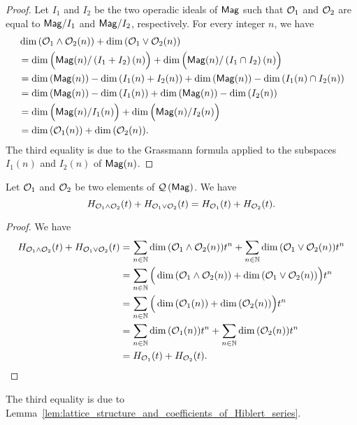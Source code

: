 \begin{proof}
  Let $I_1$ and $I_2$ be the two operadic ideals of $\mathsf{Mag}$ such that $\mathcal{O}_1$ and $\mathcal{O}_2$ are equal to $\mathsf{Mag}/I_1$ and $\mathsf{Mag}/I_2$, respectively. For every integer $n$, we have
  \[\begin{split}
  &\dim{\left(\mathcal{O}_1\wedge\mathcal{O}_2(n)\right)}+\dim{\left(\mathcal{O}_1\vee\mathcal{O}_2(n)\right)}\\
  &=\dim{\Big(\mathsf{Mag}(n)/\left(I_1+I_2\right)(n)\Big)}+\dim{\Big(\mathsf{Mag}(n)/\left(I_1\cap I_2\right)(n)\Big)}\\
  &=\dim{\left(\mathsf{Mag}(n)\right)}-\dim{\left(I_1(n)+I_2(n)\right)}+\dim{\left(\mathsf{Mag}(n)\right)}-\dim{\left(I_1(n)\cap I_2(n)\right)}\\
  &=\dim{\left(\mathsf{Mag}(n)\right)}-\dim{\left(I_1(n)\right)}+\dim{\left(\mathsf{Mag}(n)\right)}-\dim{\left(I_2(n)\right)}\\
  &=\dim{\Big(\mathsf{Mag}(n)/I_1(n)\Big)}+\dim{\Big(\mathsf{Mag}(n)/I_2(n)\Big)}\\
  &=\dim{\left(\mathcal{O}_1(n)\right)}+\dim{\left(\mathcal{O}_2(n)\right)}.
  \end{split}\]
  The third equality is due to the Grassmann formula applied to the subspaces $I_1(n)$ and $I_2(n)$ of $\mathsf{Mag}(n)$.
\end{proof}

\begin{Theorem} \label{thm:Grassmann_formula_for__Hilbert_series_of_QMag}
  Let $\mathcal{O}_1$ and $\mathcal{O}_2$ be two elements of $\mathcal{Q}\left(\mathsf{Mag}\right)$. We have
  \begin{equation} \label{equ:lattice_structure_and_Hiblert_series}
    H_{\mathcal{O}_1\wedge\mathcal{O}_2}(t)+H_{\mathcal{O}_1\vee\mathcal{O}_2}(t)=H_{\mathcal{O}_1}(t)+H_{\mathcal{O}_2}(t).
    \end{equation}
  \end{Theorem}

\begin{proof}
  We have
  \[\begin{split}
  H_{\mathcal{O}_1\wedge\mathcal{O}_2}(t)+H_{\mathcal{O}_1\vee\mathcal{O}_2}(t)&=\sum_{n\in\mathbb{N}}\dim{\left(\mathcal{O}_1\wedge\mathcal{O}_2(n)\right)}t^n+\sum_{n\in\mathbb{N}}\dim{\left(\mathcal{O}_1\vee\mathcal{O}_2(n)\right)}t^n\\
  &=\sum_{n\in\mathbb{N}}\Big(\dim{\left(\mathcal{O}_1\wedge\mathcal{O}_2(n)\right)}+\dim{\left(\mathcal{O}_1\vee\mathcal{O}_2(n)\right)}\Big)t^n\\
  &=\sum_{n\in\mathbb{N}}\Big(\dim{\left(\mathcal{O}_1(n)\right)}+\dim{\left(\mathcal{O}_2(n)\right)}\Big)t^n\\
  &=\sum_{n\in\mathbb{N}}\dim{\left(\mathcal{O}_1(n)\right)}t^n+\sum_{n\in\mathbb{N}}\dim{\left(\mathcal{O}_2(n)\right)}t^n\\
  &=H_{\mathcal{O}_1}(t)+H_{\mathcal{O}_2}(t).
  \end{split}\]
\end{proof}
The third equality is due to Lemma~\ref{lem:lattice_structure_and_coefficients_of_Hiblert_series}.


